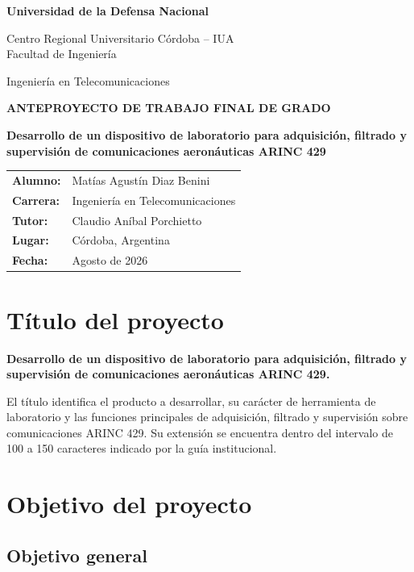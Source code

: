 \documentclass[12pt,a4paper,oneside]{article}
\newcommand{\Institucion}{Universidad de la Defensa Nacional}
\newcommand{\UnidadAcademica}{Centro Regional Universitario Córdoba -- IUA\\Facultad de Ingeniería}
\newcommand{\Carrera}{Ingeniería en Telecomunicaciones}
\newcommand{\AutorTFG}{Matías Agustín Diaz Benini}
\newcommand{\TutorTFG}{Claudio Aníbal Porchietto}
\newcommand{\CiudadTFG}{Córdoba, Argentina}
\newcommand{\FechaTFG}{Agosto de 2026}
\newcommand{\TituloProyecto}{Desarrollo de un dispositivo de laboratorio para adquisición, filtrado y supervisión de comunicaciones aeronáuticas ARINC 429}
\begin{document}
\begin{titlepage}
  \centering
  {\Large\bfseries \Institucion\par}
  \vspace{0.25cm}
  {\large \UnidadAcademica\par}
  \vspace{0.9cm}
  {\large \Carrera\par}

  \vfill

  {\Large\bfseries ANTEPROYECTO DE TRABAJO FINAL DE GRADO\par}
  \vspace{1.1cm}
  {\LARGE\bfseries\color{azulinstitucional} \TituloProyecto\par}

  \vfill

  \begin{tabular}{>{\bfseries}p{4.1cm}p{8.2cm}}
    Alumno: & \AutorTFG \\
    Carrera: & \Carrera \\
    Tutor: & \TutorTFG \\
    Lugar: & \CiudadTFG \\
    Fecha: & \FechaTFG \\
  \end{tabular}

  \vfill
\end{titlepage}

\begingroup
\small
\tableofcontents
\endgroup
\clearpage

\section{Título del proyecto}

\textbf{\TituloProyecto.}

El título identifica el producto a desarrollar, su carácter de herramienta de laboratorio y las funciones principales de adquisición, filtrado y supervisión sobre comunicaciones ARINC 429. Su extensión se encuentra dentro del intervalo de 100 a 150 caracteres indicado por la guía institucional.

\section{Objetivo del proyecto}

\subsection{Objetivo general}
\end{document}
